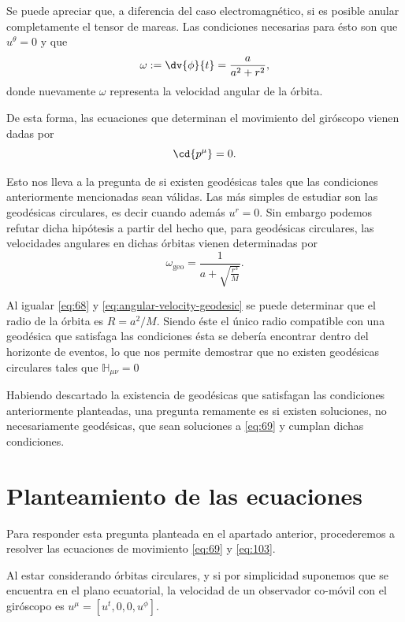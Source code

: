 Se puede apreciar que, a diferencia del caso electromagnético, si es posible anular completamente el tensor de mareas. Las condiciones necesarias para ésto son que $u^{\theta}=0$ y  que
\begin{equation}
\label{eq:68}
\omega := \dv{\phi}{t} = \frac{a}{a^2 + r^2},
\end{equation}
donde nuevamente $\omega$ representa la velocidad angular de la órbita.

De esta forma, las ecuaciones que determinan el movimiento del giróscopo vienen dadas por 
\begin{equation}
\label{eq:69}
\cd{p^{\mu}} = 0.
\end{equation}

Esto nos lleva a la pregunta de si existen geodésicas tales que las condiciones anteriormente mencionadas sean válidas. Las más simples de estudiar son las geodésicas circulares, es decir cuando además $u^r=0$. Sin embargo podemos refutar dicha hipótesis a partir del hecho que, para geodésicas circulares, las velocidades angulares en dichas órbitas vienen determinadas por \cite{Matolcsi} 
\begin{equation}
\label{eq:angular-velocity-geodesic}
\omega_{\mathrm{geo}} = \frac{1}{a + \sqrt{\frac{r^3}{M}}}.
\end{equation}

Al igualar \eqref{eq:68} y \eqref{eq:angular-velocity-geodesic} se puede determinar que el radio de la órbita es $R=a^2/M$. Siendo éste el único radio compatible con una geodésica que satisfaga las condiciones ésta se debería encontrar dentro del horizonte de eventos, lo que nos permite demostrar que no existen geodésicas circulares tales que $\mathbb{H}_{\mu \nu}=0$

Habiendo descartado la existencia de geodésicas que satisfagan las condiciones anteriormente planteadas, una pregunta remamente es si existen soluciones, no necesariamente geodésicas, que sean soluciones a \eqref{eq:69} y cumplan dichas condiciones.

\section{Planteamiento de las ecuaciones}

Para responder esta pregunta planteada en el apartado anterior, procederemos a resolver las ecuaciones de movimiento \eqref{eq:69} y \eqref{eq:103}. 

Al estar considerando órbitas circulares, y si por simplicidad suponemos que se encuentra en el plano ecuatorial, la velocidad de un observador co-móvil con el giróscopo es $u^{\mu} = \left[ u^t,0,0,u^{\phi} \right]$.

